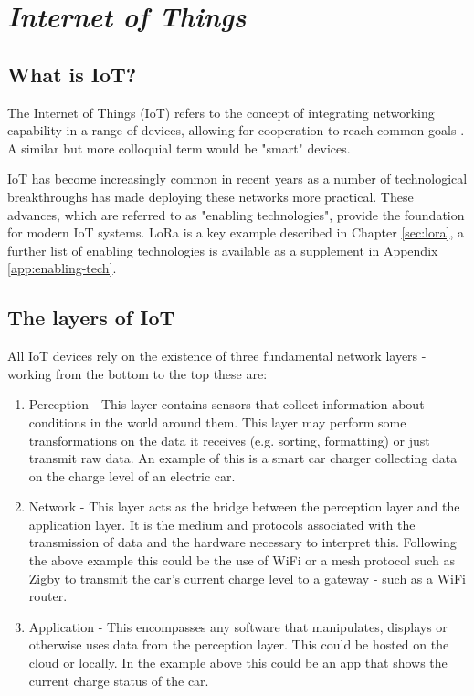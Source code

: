 \section{\emph{Internet of Things}}

\subsection{What is IoT?}

The Internet of Things (IoT) refers to the concept of integrating networking
capability in a range of devices, allowing for cooperation to reach common goals
\cite{atzori2010}. A similar but more colloquial term would be "smart" devices.

IoT has become increasingly common in recent years as a number of technological
breakthroughs has made deploying these networks more practical. These advances,
which are referred to as "enabling technologies", provide the foundation for
modern IoT systems. LoRa is a key example described in Chapter \ref{sec:lora}, a
further list of enabling technologies is available as a supplement in Appendix
\ref{app:enabling-tech}.

\subsection{The layers of IoT}

All IoT devices rely on the existence of three fundamental network layers
\cite{burhan2018iot} - working from the bottom to the top these are:

\begin{enumerate}
  \item Perception - This layer contains sensors that collect information about
        conditions in the world around them. This layer may perform some
        transformations on the data it receives (e.g. sorting, formatting) or just
        transmit raw data. An example of this is a smart car charger collecting data
        on the charge level of an electric car.
  \item Network - This layer acts as the bridge between the perception layer and
        the application layer. It is the medium and protocols associated with the
        transmission of data and the hardware necessary to interpret this. Following
        the above example this could be the use of WiFi or a mesh protocol such as
        Zigby to transmit the car's current charge level to a gateway - such as a WiFi
        router.
  \item Application - This encompasses any software that manipulates, displays
        or otherwise uses data from the perception layer. This could be hosted on the
        cloud or locally. In the example above this could be an app that shows the
        current charge status of the car.
\end{enumerate}


